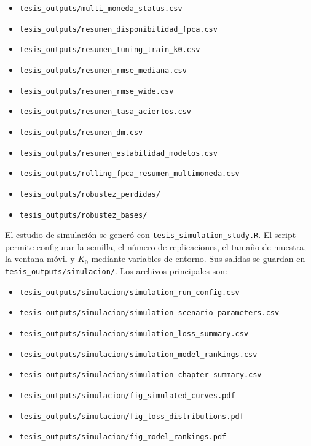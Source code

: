 \documentclass[a4paper,11pt]{article}
\begin{document}
\begin{itemize}
  \item \texttt{tesis\_outputs/multi\_moneda\_status.csv}
  \item \texttt{tesis\_outputs/resumen\_disponibilidad\_fpca.csv}
  \item \texttt{tesis\_outputs/resumen\_tuning\_train\_k0.csv}
  \item \texttt{tesis\_outputs/resumen\_rmse\_mediana.csv}
  \item \texttt{tesis\_outputs/resumen\_rmse\_wide.csv}
  \item \texttt{tesis\_outputs/resumen\_tasa\_aciertos.csv}
  \item \texttt{tesis\_outputs/resumen\_dm.csv}
  \item \texttt{tesis\_outputs/resumen\_estabilidad\_modelos.csv}
  \item \texttt{tesis\_outputs/rolling\_fpca\_resumen\_multimoneda.csv}
  \item \texttt{tesis\_outputs/robustez\_perdidas/}
  \item \texttt{tesis\_outputs/robustez\_bases/}
\end{itemize}

El estudio de simulación se generó con \texttt{tesis\_simulation\_study.R}. El script permite configurar la semilla, el número de replicaciones, el tamaño de muestra, la ventana móvil y \(K_0\) mediante variables de entorno. Sus salidas se guardan en \texttt{tesis\_outputs/simulacion/}. Los archivos principales son:

\begin{itemize}
  \item \texttt{tesis\_outputs/simulacion/simulation\_run\_config.csv}
  \item \texttt{tesis\_outputs/simulacion/simulation\_scenario\_parameters.csv}
  \item \texttt{tesis\_outputs/simulacion/simulation\_loss\_summary.csv}
  \item \texttt{tesis\_outputs/simulacion/simulation\_model\_rankings.csv}
  \item \texttt{tesis\_outputs/simulacion/simulation\_chapter\_summary.csv}
  \item \texttt{tesis\_outputs/simulacion/fig\_simulated\_curves.pdf}
  \item \texttt{tesis\_outputs/simulacion/fig\_loss\_distributions.pdf}
  \item \texttt{tesis\_outputs/simulacion/fig\_model\_rankings.pdf}
\end{itemize}
\end{document}
